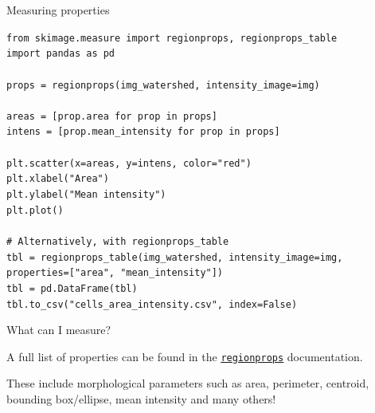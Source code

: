 \documentclass[9pt, aspectratio=169]{beamer}
\begin{document}
\begin{frame}
    {Measuring properties}
    \begin{codebox}
        \texttt{from skimage.measure import regionprops, regionprops\_table\\
        import pandas as pd\\
        \\
        props = regionprops(img\_watershed, intensity\_image=img)\\
        \\
        areas = [prop.area for prop in props]\\
        intens = [prop.mean\_intensity for prop in props]\\
        \\
        plt.scatter(x=areas, y=intens, color="red")\\
        plt.xlabel("Area")\\
        plt.ylabel("Mean intensity")\\
        plt.plot()\\
        \\
        \pause
        \# Alternatively, with regionprops\_table\\
        tbl = regionprops\_table(img\_watershed, intensity\_image=img, \\
        properties=["area", "mean\_intensity"])      \\
        tbl = pd.DataFrame(tbl)\\
        tbl.to\_csv("cells\_area\_intensity.csv", index=False)
        }
    \end{codebox}
\end{frame}

\begin{frame}
    {What can I measure?}

    A full list of properties can be found in the \href{https://scikit-image.org/docs/dev/api/skimage.measure.html\#skimage.measure.regionprops}{\texttt{\underline{regionprops}}} documentation.

    These include morphological parameters such as area, perimeter, centroid, bounding box/ellipse, mean intensity and many others!
\end{frame}
\end{document}
